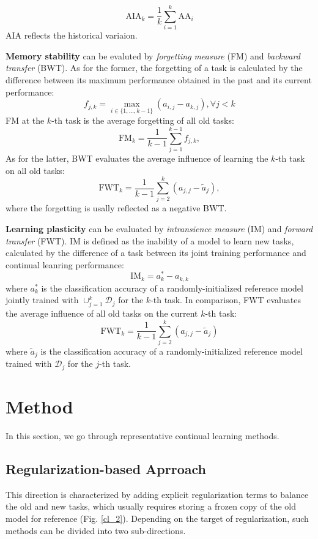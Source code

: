 \begin{equation*}
    \mathrm{AIA}_{k}=\frac{1}{k} \sum_{i=1}^{k} \mathrm{AA}_{i}
\end{equation*}
AIA reflects the historical variaion.

\textbf{Memory stability} can be evaluted by \textit{forgetting measure} (FM) and \textit{backward transfer} (BWT). As for the former, the forgetting of a task is calculated by the difference between its maximum performance obtained in the past and its current performance:
\begin{equation*}
    f_{j, k}=\max _{i \in\{1, \ldots, k-1\}}\left(a_{i, j}-a_{k, j}\right), \forall j<k
\end{equation*}
FM at the \(k\)-th task is the average forgetting of all old tasks:
$$
    \mathrm{FM}_{k}=\frac{1}{k-1} \sum_{j=1}^{k-1} f_{j, k},
$$
As for the latter, BWT evaluates the average influence of learning the \(k\)-th task on all old tasks:
$$
    \mathrm{FWT}_{k}=\frac{1}{k-1} \sum_{j=2}^{k}\left(a_{j, j}-\tilde{a}_{j}\right),
$$
where the forgetting is usally reflected as a negative BWT.

\textbf{Learning plasticity} can be evaluated by \textit{intransience measure} (IM) and \textit{forward transfer} (FWT). IM is defined as the inability of a model to learn new tasks, calculated by the difference of a task between its joint training performance and continual leanring performance:
$$
    \mathrm{IM}_{k}=a_{k}^{*}-a_{k, k}
$$
where \(a_{k}^{*}\) is the classification accuracy of a randomly-initialized reference model jointly trained with \(\cup_{j=1}^{k} \mathcal{D}_{j}\) for the \(k\)-th task. In comparison, FWT evaluates the average influence of all old tasks on the current \(k\)-th task:
$$
    \mathrm{FWT}_{k}=\frac{1}{k-1} \sum_{j=2}^{k}\left(a_{j, j}-\tilde{a}_{j}\right)
$$
where \(\tilde{a}_{j}\) is the classification accuracy of a randomly-initialized reference model trained with \(\mathcal{D}_{j}\) for the \(j\)-th task.

\section{Method}

In this section, we go through representative continual learning methods.

\subsection{Regularization-based Aprroach}
This direction is characterized by adding explicit regularization terms to balance the old and new tasks, which usually requires storing a frozen copy of the old model for reference (Fig. \ref{cl_2}). Depending on the target of regularization, such methods can be divided into two sub-directions.

